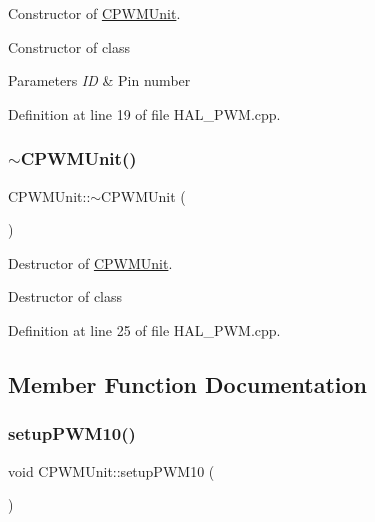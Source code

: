 Constructor of \mbox{\hyperlink{class_c_p_w_m_unit}{C\+P\+W\+M\+Unit}}. 

Constructor of class


\begin{DoxyParams}{Parameters}
{\em ID} & Pin number \\
\hline
\end{DoxyParams}


Definition at line 19 of file H\+A\+L\+\_\+\+P\+W\+M.\+cpp.

\mbox{\label{class_c_p_w_m_unit_aabfa153a1f1019befa096147428a3822}} 
\subsubsection{\texorpdfstring{$\sim$\+C\+P\+W\+M\+Unit()}{~CPWMUnit()}}
{\footnotesize\ttfamily C\+P\+W\+M\+Unit\+::$\sim$\+C\+P\+W\+M\+Unit (\begin{DoxyParamCaption}{ }\end{DoxyParamCaption})}



Destructor of \mbox{\hyperlink{class_c_p_w_m_unit}{C\+P\+W\+M\+Unit}}. 

Destructor of class 

Definition at line 25 of file H\+A\+L\+\_\+\+P\+W\+M.\+cpp.



\subsection{Member Function Documentation}
\mbox{\label{class_c_p_w_m_unit_aa36627883e91d3dec4a76fe187588071}} 
\subsubsection{\texorpdfstring{setup\+P\+W\+M10()}{setupPWM10()}}
{\footnotesize\ttfamily void C\+P\+W\+M\+Unit\+::setup\+P\+W\+M10 (\begin{DoxyParamCaption}{ }\end{DoxyParamCaption})}



